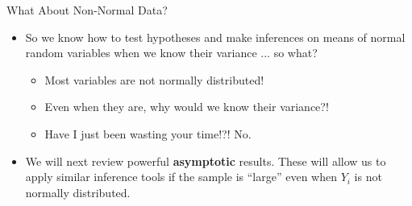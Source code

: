 \documentclass[11pt,english,handout]{beamer}
\begin{document}
\begin{frame}{What About Non-Normal Data?}
\vspace{0.2cm}
\begin{itemize}
\item So we know how to test hypotheses and make inferences on means of normal random variables when we know their variance ... so what?
\pause{}
\smallskip

\begin{itemize}
\item Most variables are not normally distributed!\pause{}
\vspace{0.1cm}
\item Even when they are, why would we know their variance?!\pause{}
\vspace{0.1cm}
\item Have I just been wasting your time!?! \pause{} No.\pause{}
\end{itemize}
\vspace{0.4cm}

\item We will next review powerful \textbf{asymptotic} results. These will allow us to apply similar inference tools if the sample is ``large'' even when $Y_i$ is not normally distributed.
\end{itemize}

\end{frame}
\end{document}
